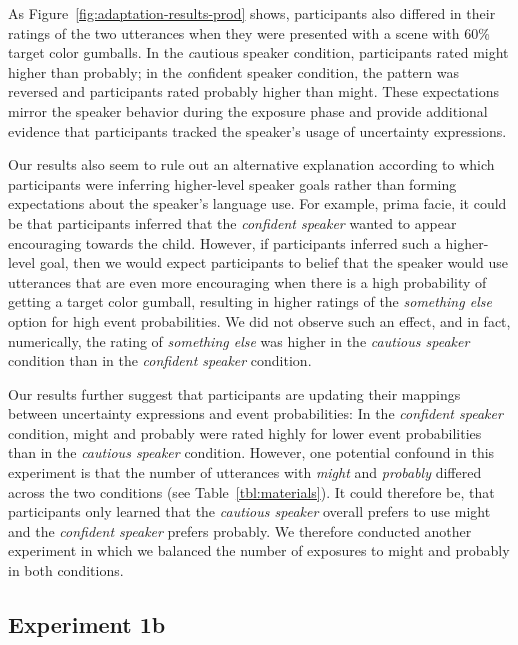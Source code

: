 \documentclass[lucida,biblatex]{sp} %
\begin{document}
As Figure~\ref{fig:adaptation-results-prod} shows, participants also differed in their ratings of the two utterances when they were presented with a scene with 60\% target color gumballs. In the {\emph cautious speaker} condition, participants rated {\sc might} higher than {\sc probably}; in the {\emph confident speaker} condition, the pattern was reversed and participants rated {\sc probably} higher than {\sc might}. These expectations mirror the speaker behavior during the exposure phase and provide additional evidence that participants tracked the speaker's usage of uncertainty expressions. 

Our results also seem to rule out an alternative explanation according to which participants were inferring higher-level speaker goals rather than forming expectations about the speaker's language use. For example, prima facie, it could be that participants inferred that the  \textit{confident speaker} wanted to appear encouraging towards the child. However, if participants inferred such a higher-level goal, then we would expect participants to belief that the speaker would use utterances that are even more encouraging when there is a high probability of getting a target color gumball, resulting in higher ratings of the \textit{something else} option for high event probabilities. We did not observe such an effect, and  in fact, numerically, the rating of \emph{something else} was higher in the \emph{cautious speaker} condition than in the \textit{confident speaker} condition.

Our results further suggest that participants are updating their mappings between uncertainty expressions and event probabilities: In the {\it confident speaker} condition, {\sc might} and {\sc probably} were rated highly for lower event probabilities than in the {\it cautious speaker} condition. However, one potential confound in this experiment is that the number of utterances with \textit{might} and \textit{probably} differed across the two conditions (see Table~\ref{tbl:materials}). It could therefore be, that participants only learned that the {\it cautious speaker} overall prefers to use {\sc might} and the {\it confident speaker} prefers {\sc probably}. We therefore conducted another experiment in which we balanced the number of exposures to {\sc might} and {\sc probably} in both conditions.

\subsection{Experiment 1b}
\end{document}
